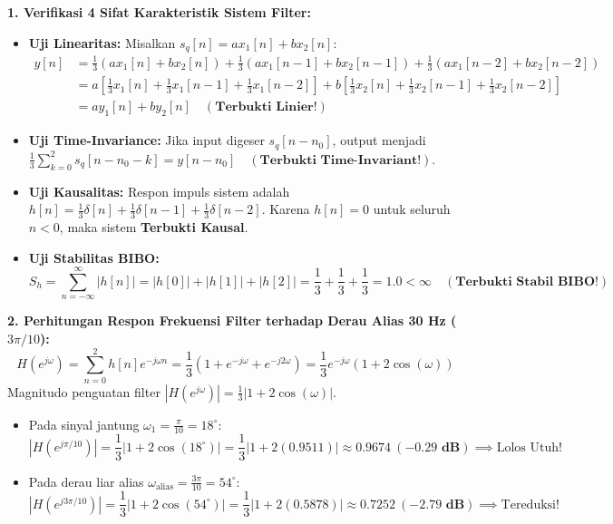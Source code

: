 \documentclass[11pt,a4paper]{article}
\begin{document}
\textbf{1. Verifikasi 4 Sifat Karakteristik Sistem Filter:}
\begin{itemize}[leftmargin=*]
  \item \textbf{Uji Linearitas:} Misalkan $s_q[n] = a x_1[n] + b x_2[n]$:
  \begin{align*}
  y[n] &= \frac{1}{3}(a x_1[n] + b x_2[n]) + \frac{1}{3}(a x_1[n-1] + b x_2[n-1]) + \frac{1}{3}(a x_1[n-2] + b x_2[n-2]) \\
  &= a \left[\frac{1}{3}x_1[n] + \frac{1}{3}x_1[n-1] + \frac{1}{3}x_1[n-2]\right] + b \left[\frac{1}{3}x_2[n] + \frac{1}{3}x_2[n-1] + \frac{1}{3}x_2[n-2]\right] \\
  &= a y_1[n] + b y_2[n] \quad \mathbf{(\text{Terbukti Linier!})}
  \end{align*}
  \item \textbf{Uji Time-Invariance:} Jika input digeser $s_q[n-n_0]$, output menjadi $\frac{1}{3}\sum_{k=0}^2 s_q[n-n_0-k] = y[n-n_0] \quad \mathbf{(\text{Terbukti Time-Invariant!})}$.
  \item \textbf{Uji Kausalitas:} Respon impuls sistem adalah $h[n] = \frac{1}{3}\delta[n] + \frac{1}{3}\delta[n-1] + \frac{1}{3}\delta[n-2]$. Karena $h[n] = 0$ untuk seluruh $n < 0$, maka sistem \textbf{Terbukti Kausal}.
  \item \textbf{Uji Stabilitas BIBO:}
  \begin{equation}
  S_h = \sum_{n=-\infty}^{\infty} |h[n]| = |h[0]| + |h[1]| + |h[2]| = \frac{1}{3} + \frac{1}{3} + \frac{1}{3} = \mathbf{1.0 < \infty} \quad \mathbf{(\text{Terbukti Stabil BIBO!})}
  \end{equation}
\end{itemize}

\vspace{0.2cm}
\textbf{2. Perhitungan Respon Frekuensi Filter terhadap Derau Alias 30 Hz ($3\pi/10$):}
\begin{equation}
H(e^{j\omega}) = \sum_{n=0}^2 h[n] e^{-j\omega n} = \frac{1}{3}\left( 1 + e^{-j\omega} + e^{-j2\omega} \right) = \frac{1}{3} e^{-j\omega} \left( 1 + 2\cos(\omega) \right)
\end{equation}
Magnitudo penguatan filter $|H(e^{j\omega})| = \frac{1}{3}|1 + 2\cos(\omega)|$.
\begin{itemize}[leftmargin=*]
  \item Pada sinyal jantung $\omega_1 = \frac{\pi}{10} = 18^\circ$:
  \begin{equation}
  |H(e^{j\pi/10})| = \frac{1}{3}|1 + 2\cos(18^\circ)| = \frac{1}{3}|1 + 2(0.9511)| \approx \mathbf{0.9674\ (-0.29\text{ dB})} \implies \text{Lolos Utuh!}
  \end{equation}
  \item Pada derau liar alias $\omega_{\text{alias}} = \frac{3\pi}{10} = 54^\circ$:
  \begin{equation}
  |H(e^{j3\pi/10})| = \frac{1}{3}|1 + 2\cos(54^\circ)| = \frac{1}{3}|1 + 2(0.5878)| \approx \mathbf{0.7252\ (-2.79\text{ dB})} \implies \text{Tereduksi!}
  \end{equation}
\end{itemize}
\end{document}
